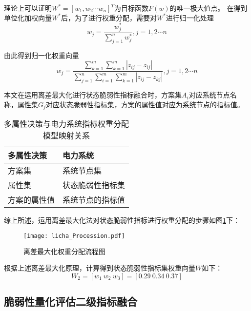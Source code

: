 理论上可以证明$W^* = [w_1,w_2 \cdots w_n]^T$为目标函数$F(w)$的唯一极大值点。 在得到单位化加权向量$W^*$后，为了进行权重分配，需要对$W^*$进行归一化处理
\begin{equation}
  \bar{w_{j}} = \frac{w_{j}^*}{\sum_{j=1}^{n} w_{j}^*} , j=1,2 \cdots n  
\end{equation}

由此得到归一化权重向量
\begin{equation}
  \bar{w_{j}}=\frac{\sum_{k=1}^{m} \sum_{k=1}^{m}\left|z_{i j}-z_{i j}\right|}{\sum_{j=1}^{n}\sum_{i=1}^{m} \sum_{k=1}^{m} | z_{ij}-z_{k j}|}, j=1,2 \cdots n
  \end{equation}

本文在运用离差最大化进行状态脆弱性指标融合时，方案集$A_i$对应系统节点名称，属性集$G_j$对应状态脆弱性指标集，方案的属性值对应为系统节点的指标值。
\begin{table}[htb]
  \centering
  \caption{多属性决策与电力系统指标权重分配模型映射关系}
  \label{tab:PRComparision}
    \begin{tabular}{C{4.5cm}C{4.5cm}}
      \toprule
      多属性决策 & 电力系统 \\
      \midrule
      方案集 & 系统节点集 \\
      属性集 & 状态脆弱性指标集 \\
      方案的属性值 & 系统节点的指标值 \\
      \bottomrule
    \end{tabular}
\end{table}

综上所述，运用离差最大化法对状态脆弱性指标进行权重分配的步骤如图\ref{fig:licha_Procession}下：
\begin{figure}[H] %
  \centering
  \texttt{[image: licha\_Procession.pdf]}
  \caption{离差最大化权重分配流程图}
  \label{fig:licha_Procession}
\end{figure}

根据上述离差最大化原理，计算得到状态脆弱性指标集权重向量$W$如下：
\begin{equation}
  \label{equ:chap4:quanzhong2}
    W_2 = \left[w_{1}\ w_{2}\ w_{3}\right]=[0.29\ 0.34\ 0.37]
    \end{equation}


\subsection{脆弱性量化评估二级指标融合}
\label{sec:2ndIndexMerge}





